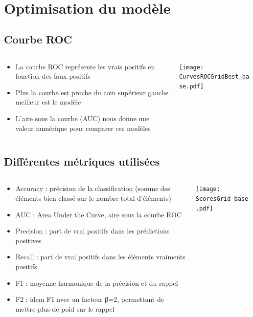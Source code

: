 \documentclass[8pt,aspectratio=169,hyperref={unicode=true}]{beamer}
\begin{document}
\section{Optimisation du modèle}
\subsection{Courbe ROC}
\begin{frame}{\insertsection}{\insertsubsection}
    \begin{columns}
        \begin{column}{.5\textwidth}
            \begin{itemize}
                \item La courbe ROC représente les vrais positifs en fonction des faux positifs
                \item Plus la courbe est proche du coin supérieur gauche meilleur est le modèle
                \item L'aire sous la courbe (AUC) nous donne une valeur numérique pour comparer ces modèles
            \end{itemize}
        \end{column}
        \begin{column}{.5\textwidth}
            \texttt{[image: CurvesROCGridBest\_base.pdf]}
        \end{column}
    \end{columns}
\end{frame}

\subsection{Différentes métriques utilisées}
\begin{frame}{\insertsection}{\insertsubsection}
    \begin{columns}
        \begin{column}{.5\textwidth}
            \begin{itemize}
                \item Accuracy : précision de la classification (somme des éléments bien classé sur le nombre total d'éléments)
                \item AUC : Area Under the Curve, aire sous la courbe ROC
                \item Precision : part de vrai positifs dans les prédictions positives
                \item Recall : part de vrai positifs dans les éléments vraiments positifs
                \item F1 : moyenne harmonique de la précision et du rappel
                \item F2 : idem F1 avec un facteur β=2, permettant de mettre plus de poid sur le rappel
            \end{itemize}
        \end{column}
        \begin{column}{.5\textwidth}
            \texttt{[image: ScoresGrid\_base.pdf]}
        \end{column}
    \end{columns}
\end{frame}
\end{document}
